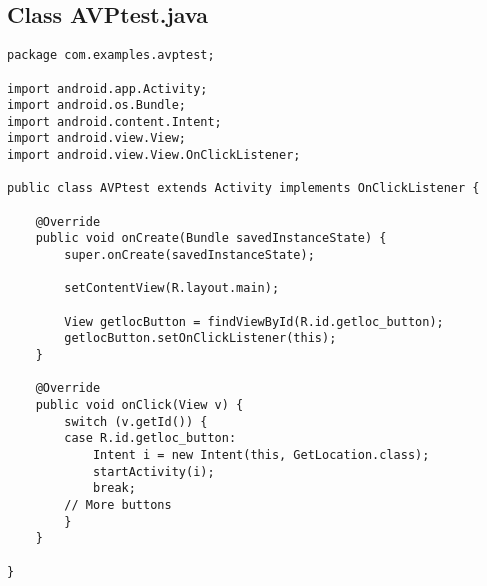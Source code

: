 \documentclass[letterpaper,twocolumn,10pt]{article}
\begin{document}
\subsection{Class AVPtest.java}
\begin{lstlisting}
package com.examples.avptest;

import android.app.Activity;
import android.os.Bundle;
import android.content.Intent;
import android.view.View;
import android.view.View.OnClickListener;

public class AVPtest extends Activity implements OnClickListener {

	@Override
	public void onCreate(Bundle savedInstanceState) {
		super.onCreate(savedInstanceState);

		setContentView(R.layout.main);
		
		View getlocButton = findViewById(R.id.getloc_button);
		getlocButton.setOnClickListener(this);
	}

	@Override
	public void onClick(View v) {
		switch (v.getId()) {
		case R.id.getloc_button:
			Intent i = new Intent(this, GetLocation.class);
			startActivity(i);
			break;
		// More buttons
		}
	}

}
\end{lstlisting}
\end{document}
